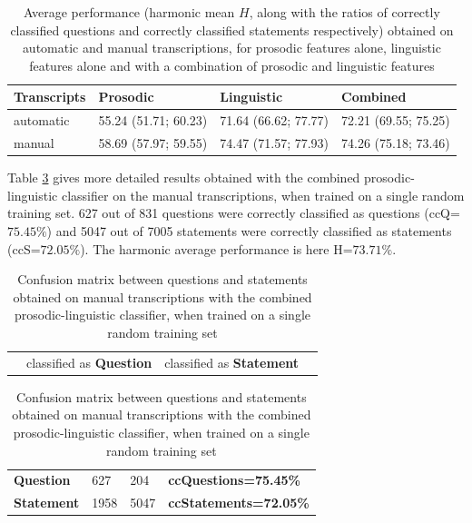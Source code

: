 \documentclass[runningheads,a4paper]{llncs}
\begin{document}
\begin{table}
\caption{Average performance (harmonic mean $H$, along with the ratios of correctly classified questions and  correctly classified statements respectively) obtained on automatic and manual transcriptions, for prosodic features alone, linguistic features alone and with a combination of prosodic and linguistic features}
\label{Tab:perfAM}
\centering
\begin{tabular}{|p{2.3cm}|p{3cm}|p{3cm}|p{3cm}|}
\hline
{\bf Transcripts}  	& {\bf Prosodic}  		& {\bf Linguistic} 		& {\bf Combined}	\\ \hline
automatic 		& 55.24  (51.71; 60.23)  	& 71.64  (66.62; 77.77) 	& 72.21  (69.55; 75.25)	\\ \hline
manual 			& 58.69  (57.97; 59.55) 	& 74.47  (71.57; 77.93) 	& 74.26	 (75.18; 73.46)	\\ \hline
\end{tabular}
\end{table}

Table \ref{Tab:cMatrix} gives more detailed results obtained with the combined prosodic-linguistic classifier on the manual transcriptions, when trained on a single random training set.
627 out of 831 questions were correctly classified as questions (ccQ=$75.45\%$) and 5047 out of 7005 statements were correctly classified as statements (ccS=$72.05\%$).
The harmonic average performance is here H=$73.71\%$.

\begin{table}
\renewcommand{\arraystretch}{1.3}
\caption{Confusion matrix between questions and statements obtained on manual transcriptions with the combined prosodic-linguistic classifier, when trained on a single random training set}
\label{Tab:cMatrix}
\centering
\begin{tabular}{p{2.01cm}|p{1.8cm}|p{1.8cm}|p{2.5cm}}
\cline{2-3}
& classified as \textbf{Question} & classified as \textbf{Statement} &   \\
\end{tabular}

\begin{tabular}{|p{2cm}|p{1.8cm}|p{1.8cm}|p{2.5cm}}
\cline{1-3}
\textbf{Question}  &    627 & 204   & \textbf{ccQuestions=75.45\%} \\ \cline{1-3}
\textbf{Statement} &  1958 & 5047   & \textbf{ccStatements=72.05\%} \\ \cline{1-3}
\end{tabular}
\end{table}
\end{document}
